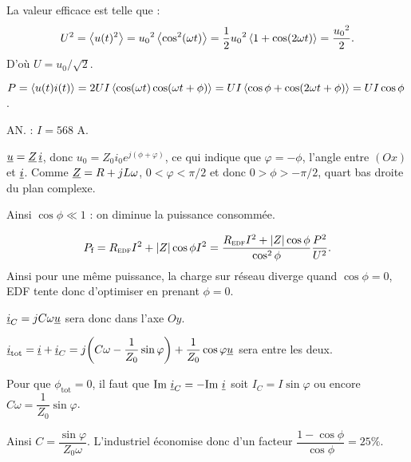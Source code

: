 \begin{solution}
    \begin{questions}
        \question La valeur efficace est telle que :
        $$U^2 = \ev{u(t)^2} = {u_0}^2 \ev{\cos^2(\omega t)} = \dfrac{1}{2}{u_0}^2 \ev{1 + \cos(2\omega t)} = \dfrac{{u_0}^2}{2}.$$
        D'où $U = u_0/\sqrt{2}$.

        \question $P = \ev{u(t) i(t)} = 2 UI\ev{\cos(\omega t)\cos(\omega t + \phi)} = UI\ev{\cos\phi + \cos(2\omega t + \phi)} = UI\cos\phi$.

        AN. : $I = 568$ A.

        \question $\underline{u} = \underline{Z}\, \underline{i}$, donc $u_0 = Z_0 i_0 e^{j(\phi + \varphi)}$, ce qui indique que $\varphi = -\phi$, l'angle entre $(Ox)$ et $\underline{i}$. Comme $\underline{Z} = R + jL\omega$, $0 < \varphi < \pi/2$ et donc $0 > \phi > -\pi/2$, quart bas droite du plan complexe.

        Ainsi $\cos\phi \ll 1$ : on diminue la puissance consommée.

        \question $$P_\text{f} = R_\textsc{edf} I^2 + \abs{Z}\cos\phi I^2 = \dfrac{R_\textsc{edf} I^2 + \abs{Z}\cos\phi}{\cos^2\phi}\dfrac{P^2}{U^2}.$$
        Ainsi pour une même puissance, la charge sur réseau diverge quand $\cos\phi = 0$, EDF tente donc d'optimiser en prenant $\phi = 0$.

        \question $\underline{i}_C = jC\omega \underline{u}$ sera donc dans l'axe $Oy$.
        
        $\underline{i}_\text{tot} = \underline{i} + \underline{i}_C = j\qty(C\omega - \dfrac{1}{Z_0}\sin\varphi) + \dfrac{1}{Z_0}\cos\varphi\underline{u}$ sera entre les deux.

        Pour que $\phi_\text{tot} = 0$, il faut que $\text{Im }\underline{i}_C = - \text{Im }\underline{i}$ soit $I_C = I \sin\varphi$ ou encore $C\omega = \dfrac{1}{Z_0}\sin\varphi$.

        \question Ainsi $C = \dfrac{\sin\varphi}{Z_0\omega}$. L'industriel économise donc d'un facteur $\dfrac{1 - \cos\phi}{\cos\phi} = 25\%$.
        
    \end{questions}
\end{solution}